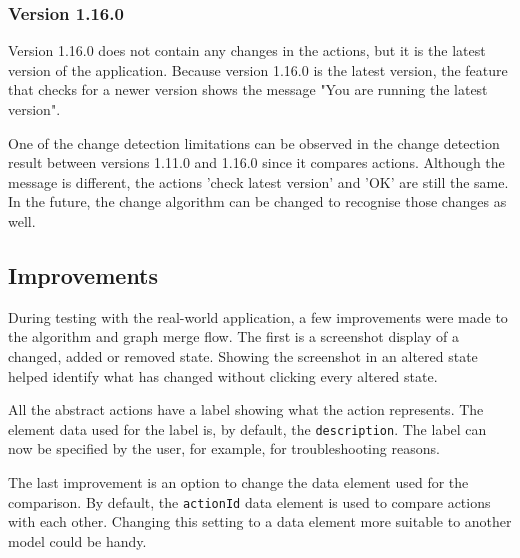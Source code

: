\subsubsection{Version 1.16.0}

Version 1.16.0 does not contain any changes in the actions, but it is the latest version of the application. Because version 1.16.0 is the latest version, the feature that checks for a newer version shows the message "You are running the latest version". 

One of the change detection limitations can be observed in the change detection result between versions 1.11.0 and 1.16.0 since it compares actions. Although the message is different, the actions 'check latest version' and 'OK' are still the same. In the future, the change algorithm can be changed to recognise those changes as well. 

\subsection{Improvements}
During testing with the real-world application, a few improvements were made to the algorithm and graph merge flow. The first is a screenshot display of a changed, added or removed state. Showing the screenshot in an altered state helped identify what has changed without clicking every altered state. 

All the abstract actions have a label showing what the action represents. The element data used for the label is, by default, the \verb|description|. The label can now be specified by the user, for example, for troubleshooting reasons. 

The last improvement is an option to change the data element used for the comparison. By default, the \verb|actionId| data element is used to compare actions with each other. Changing this setting to a data element more suitable to another model could be handy.  